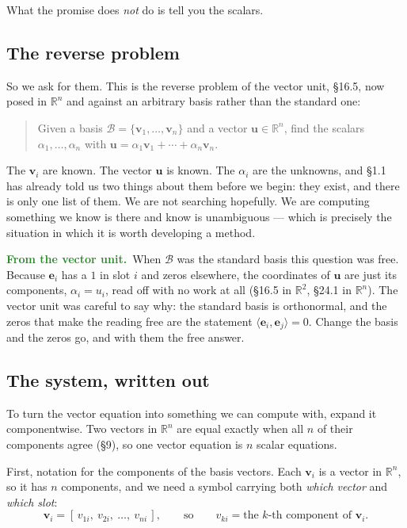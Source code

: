 \documentclass[11pt]{article}
\theoremstyle{plain}
\theoremstyle{definition}
\theoremstyle{remark}
\newcommand{\lookback}{\par\smallskip\noindent
  \textbf{\sffamily\textcolor{ForestGreen}{From the vector unit.}}\ \ignorespaces}
\newcommand{\R}{\mathbb{R}}
\newcommand{\vc}[1]{\mathbf{#1}}        %
\newcommand{\bas}{\mathcal{B}}
\begin{document}
What the promise does \emph{not} do is tell you the scalars.

\subsection{The reverse problem}
So we ask for them. This is the reverse problem of the vector unit, \S16.5, now
posed in $\R^{n}$ and against an arbitrary basis rather than the standard one:

\begin{quote}
Given a basis $\bas=\{\vc{v}_1,\dots,\vc{v}_n\}$ and a vector $\vc{u}\in\R^{n}$,
find the scalars $\alpha_1,\dots,\alpha_n$ with
$\vc{u}=\alpha_1\vc{v}_1+\cdots+\alpha_n\vc{v}_n$.
\end{quote}

\noindent The $\vc{v}_i$ are known. The vector $\vc{u}$ is known. The
$\alpha_i$ are the unknowns, and \S1.1 has already told us two things about
them before we begin: they exist, and there is only one list of them. We are
not searching hopefully. We are computing something we know is there and know is
unambiguous --- which is precisely the situation in which it is worth developing
a method.

\lookback When $\bas$ was the standard basis this question was free. Because
$\vc{e}_i$ has a $1$ in slot $i$ and zeros elsewhere, the coordinates of
$\vc{u}$ are just its components, $\alpha_i=u_i$, read off with no work at all
(\S16.5 in $\R^{2}$, \S24.1 in $\R^{n}$). The vector unit was careful to say why:
the standard basis is orthonormal, and the zeros that make the reading free are
the statement $\langle\vc{e}_i,\vc{e}_j\rangle=0$. Change the basis and the zeros
go, and with them the free answer.

\subsection{The system, written out}
To turn the vector equation into something we can compute with, expand it
componentwise. Two vectors in $\R^{n}$ are equal exactly when all $n$ of their
components agree (\S9), so one vector equation is $n$ scalar equations.

First, notation for the components of the basis vectors. Each $\vc{v}_i$ is a
vector in $\R^{n}$, so it has $n$ components, and we need a symbol carrying both
\emph{which vector} and \emph{which slot}:
\[
  \vc{v}_i = [\,v_{1i},\ v_{2i},\ \dots,\ v_{ni}\,] ,
  \qquad\text{so}\qquad
  v_{ki} = \text{the } k\text{-th component of } \vc{v}_i .
\]
\end{document}

